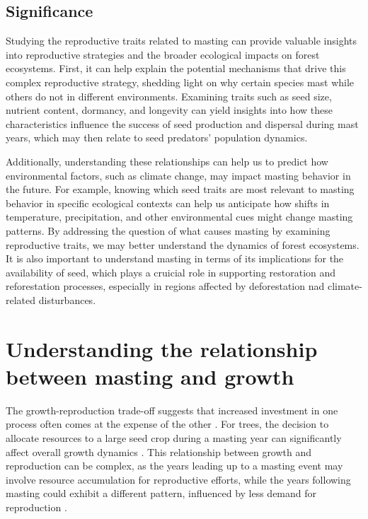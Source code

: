\documentclass[11pt,letter]{article}
\begin{document}
\subsection{Significance} 
Studying the reproductive traits related to masting can provide valuable insights into reproductive strategies and the broader ecological impacts on forest ecosystems. First, it can help explain the potential mechanisms that drive this complex reproductive strategy, shedding light on why certain species mast while others do not in different environments. Examining traits such as seed size, nutrient content, dormancy, and longevity can yield insights into how these characteristics influence the success of seed production and dispersal during mast years, which may then relate to seed predators' population dynamics.

Additionally, understanding these relationships can help us to predict how environmental factors, such as climate change, may impact masting behavior in the future. For example, knowing which seed traits are most relevant to masting behavior in specific ecological contexts can help us anticipate how shifts in temperature, precipitation, and other environmental cues might change masting patterns. By addressing the question of what causes masting by examining reproductive traits, we may better understand the dynamics of forest ecosystems. It is also important to understand masting in terms of its implications for the availability of seed, which plays a cruicial role in supporting restoration and reforestation processes, especially in regions affected by deforestation nad climate-related disturbances.

\section{Understanding the relationship between masting and growth}
The growth-reproduction trade-off suggests that increased investment in one process often comes at the expense of the other \citep{grime1977evidence, stearns1998evolution}. For trees, the decision to allocate resources to a large seed crop during a masting year can significantly affect overall growth dynamics \citep{hacket2016tree}. This relationship between growth and reproduction can be complex, as the years leading up to a masting event may involve resource accumulation for reproductive efforts, while the years following masting could exhibit a different pattern, influenced by less demand for reproduction \citep{kelly1994evolutionary}.
\end{document}
